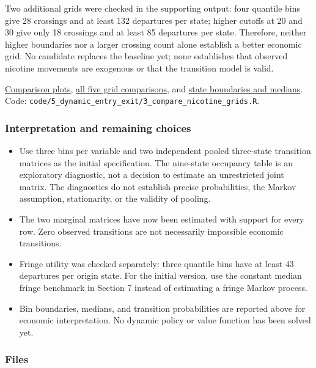 \documentclass[10pt,]{article}
\providecommand{\tightlist}{%
  \setlength{\itemsep}{0pt}\setlength{\parskip}{0pt}}
\begin{document}
Two additional grids were checked in the supporting output: four
quantile bins give 28 crossings and at least 132 departures per state;
higher cutoffs at 20 and 30 give only 18 crossings and at least 85
departures per state. Therefore, neither higher boundaries nor a larger
crossing count alone establish a better economic grid. No candidate
replaces the baseline yet; none establishes that observed nicotine
movements are exogenous or that the transition model is valid.

\href{../../output/dynamic_entry_exit/nicotine_grid_comparison_2026-11-03/nicotine_grid_comparison.pdf}{Comparison
plots},
\href{../../output/dynamic_entry_exit/nicotine_grid_comparison_2026-11-03/candidate_summary.csv}{all
five grid comparisons}, and
\href{../../output/dynamic_entry_exit/nicotine_grid_comparison_2026-11-03/state_definitions.csv}{state
boundaries and medians}. Code:
\texttt{code/5\_dynamic\_entry\_exit/3\_compare\_nicotine\_grids.R}.

\subsubsection{Interpretation and remaining
choices}\label{interpretation-and-remaining-choices}

\begin{itemize}
\tightlist
\item
  Use three bins per variable and two independent pooled three-state
  transition matrices as the initial specification. The nine-state
  occupancy table is an exploratory diagnostic, not a decision to
  estimate an unrestricted joint matrix. The diagnostics do not
  establish precise probabilities, the Markov assumption, stationarity,
  or the validity of pooling.
\item
  The two marginal matrices have now been estimated with support for
  every row. Zero observed transitions are not necessarily impossible
  economic transitions.
\item
  Fringe utility was checked separately: three quantile bins have at
  least 43 departures per origin state. For the initial version, use the
  constant median fringe benchmark in Section 7 instead of estimating a
  fringe Markov process.
\item
  Bin boundaries, medians, and transition probabilities are reported
  above for economic interpretation. No dynamic policy or value function
  has been solved yet.
\end{itemize}

\subsubsection{Files}\label{files-1}
\end{document}
